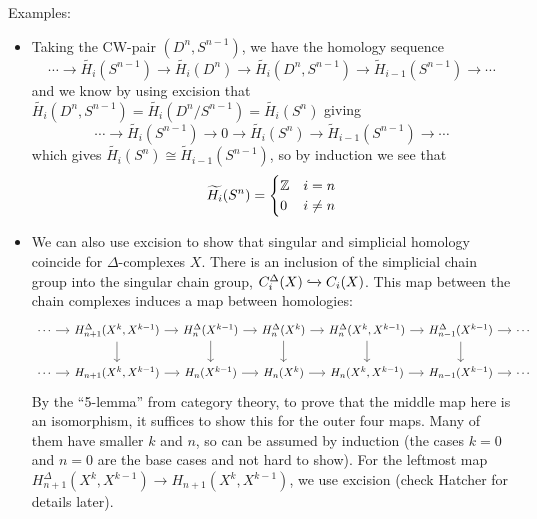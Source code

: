 \documentclass{amsart}
\begin{document}
	 Examples:
	 \begin{itemize}
	 	\item Taking the CW-pair $(D^n,S^{n-1})$, we have the homology sequence
	 	$$
	 	\cdots \to \widetilde{H_i}(S^{n-1}) \to \widetilde{H_i}(D^n) \to \widetilde{H_i}(D^n,S^{n-1})\to \widetilde{H}_{i-1}(S^{n-1}) \to \cdots
	 	$$
	 	and we know by using excision that $\widetilde{H_i}(D^n,S^{n-1})=\widetilde{H_i}(D^n/S^{n-1})=\widetilde{H_i}(S^n)$ giving
	 	$$
	 	\cdots \to \widetilde{H_i}(S^{n-1}) \to 0 \to \widetilde{H_i}(S^n) \to \widetilde{H}_{i-1}(S^{n-1}) \to \cdots
	 	$$
	 	which gives $\widetilde{H_i}(S^n) \cong \widetilde{H}_{i-1}(S^{n-1})$, so by induction we see that 
	 	$$\widetilde{H_i}(S^{n})=\begin{cases}\mathbb{Z} & i=n \\ 0 & i\neq n\end{cases}$$
	 	\item We can also use excision to show that singular and simplicial homology coincide for $\Delta$-complexes $X$. There is an inclusion of the simplicial chain group into the singular chain group, $C^{\Delta}_i(X)\xhookrightarrow{} C_i(X)$. This map between the chain complexes induces a map between homologies:
	 	$$
	 	\begin{tikzcd}[sep=small]
	 		\cdots & {H_{n+1}^{\Delta}(X^k,X^{k-1})} & {H_n^{\Delta}(X^{k-1})} & {H_n^{\Delta}(X^k)} & {H_n^{\Delta}(X^k,X^{k-1})} & {H_{n-1}^{\Delta}(X^{k-1})} & \cdots \\
	 		\\
	 		\cdots & {H_{n+1}(X^k,X^{k-1})} & {H_n(X^{k-1})} & {H_n(X^k)} & {H_n(X^k,X^{k-1})} & {H_{n-1}(X^{k-1})} & \cdots
	 		\arrow[from=1-1, to=1-2]
	 		\arrow[from=1-2, to=1-3]
	 		\arrow[from=1-2, to=3-2]
	 		\arrow[from=1-3, to=1-4]
	 		\arrow[from=1-3, to=3-3]
	 		\arrow[from=1-4, to=1-5]
	 		\arrow[from=1-4, to=3-4]
	 		\arrow[from=1-5, to=1-6]
	 		\arrow[from=1-5, to=3-5]
	 		\arrow[from=1-6, to=1-7]
	 		\arrow[from=1-6, to=3-6]
	 		\arrow[from=3-1, to=3-2]
	 		\arrow[from=3-2, to=3-3]
	 		\arrow[from=3-3, to=3-4]
	 		\arrow[from=3-4, to=3-5]
	 		\arrow[from=3-5, to=3-6]
	 		\arrow[from=3-6, to=3-7]
	 	\end{tikzcd}
	 	$$ 
	 	By the ``5-lemma'' from category theory, to prove that the middle map here is an isomorphism, it suffices to show this for the outer four maps. Many of them have smaller $k$ and $n$, so can be assumed by induction (the cases $k=0$ and $n=0$ are the base cases and not hard to show). For the leftmost map $H_{n+1}^{\Delta}(X^k,X^{k-1})\to H_{n+1}(X^k,X^{k-1})$, we use excision (check Hatcher for details later).
	 \end{itemize}
	 
\end{document}
